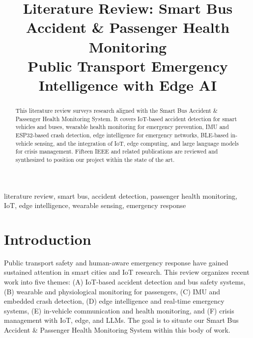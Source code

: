 \documentclass[conference]{IEEEtran}
\begin{document}
\title{Literature Review: Smart Bus Accident \& Passenger Health Monitoring\\
Public Transport Emergency Intelligence with Edge AI}

\author{%
    \and
}

\maketitle

\begin{abstract}
This literature review surveys research aligned with the Smart Bus Accident \& Passenger Health Monitoring System. It covers IoT-based accident detection for smart vehicles and buses, wearable health monitoring for emergency prevention, IMU and ESP32-based crash detection, edge intelligence for emergency networks, BLE-based in-vehicle sensing, and the integration of IoT, edge computing, and large language models for crisis management. Fifteen IEEE and related publications are reviewed and synthesized to position our project within the state of the art.
\end{abstract}

\begin{IEEEkeywords}
literature review, smart bus, accident detection, passenger health monitoring, IoT, edge intelligence, wearable sensing, emergency response
\end{IEEEkeywords}

\section{Introduction}

Public transport safety and human-aware emergency response have gained sustained attention in smart cities and IoT research. This review organizes recent work into five themes: (A) IoT-based accident detection and bus safety systems, (B) wearable and physiological monitoring for passengers, (C) IMU and embedded crash detection, (D) edge intelligence and real-time emergency systems, (E) in-vehicle communication and health monitoring, and (F) crisis management with IoT, edge, and LLMs. The goal is to situate our Smart Bus Accident \& Passenger Health Monitoring System within this body of work.
\end{document}
